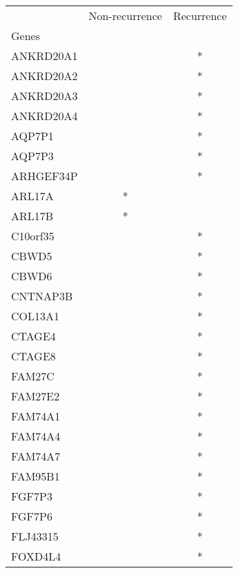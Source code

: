 \begin{tabular}{lcc}
\toprule
{} & Non-recurrence & Recurrence \\
Genes              &                &            \\
\midrule
ANKRD20A1          &                &          * \\
ANKRD20A2          &                &          * \\
ANKRD20A3          &                &          * \\
ANKRD20A4          &                &          * \\
AQP7P1             &                &          * \\
AQP7P3             &                &          * \\
ARHGEF34P          &                &          * \\
ARL17A             &              * &            \\
ARL17B             &              * &            \\
C10orf35           &                &          * \\
CBWD5              &                &          * \\
CBWD6              &                &          * \\
CNTNAP3B           &                &          * \\
COL13A1            &                &          * \\
CTAGE4             &                &          * \\
CTAGE8             &                &          * \\
FAM27C             &                &          * \\
FAM27E2            &                &          * \\
FAM74A1            &                &          * \\
FAM74A4            &                &          * \\
FAM74A7            &                &          * \\
FAM95B1            &                &          * \\
FGF7P3             &                &          * \\
FGF7P6             &                &          * \\
FLJ43315           &                &          * \\
FOXD4L4            &                &          * \\

\end{tabular}
